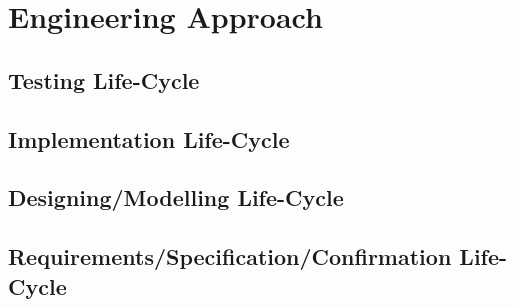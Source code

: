 \chapter{Engineering Approach}

\section{Testing Life-Cycle}
\section{Implementation Life-Cycle}
\section{Designing/Modelling Life-Cycle}
\section{Requirements/Specification/Confirmation Life-Cycle}
